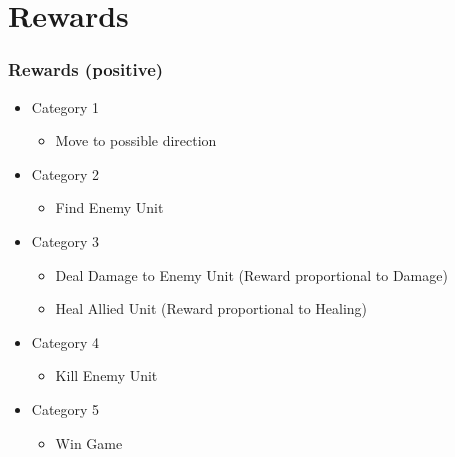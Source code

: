 \documentclass[ignorenonframetext]{beamer}
\begin{document}
\section{Rewards}

\begin{frame}
\frametitle{Rewards (positive)}
\begin{itemize}
\item Category 1
	\begin{itemize}
	\item Move to possible direction
	\end{itemize}
\item Category 2
	\begin{itemize}
	\item Find Enemy Unit
	\end{itemize}
\item Category 3
	\begin{itemize}
	\item Deal Damage to Enemy Unit (Reward proportional to Damage)
	\item Heal Allied Unit (Reward proportional to Healing)
	\end{itemize}
\item Category 4
	\begin{itemize}
	\item Kill Enemy Unit
	\end{itemize}
\item Category 5
	\begin{itemize}
	\item Win Game
	\end{itemize}
\end{itemize}
\end{frame}
\end{document}
